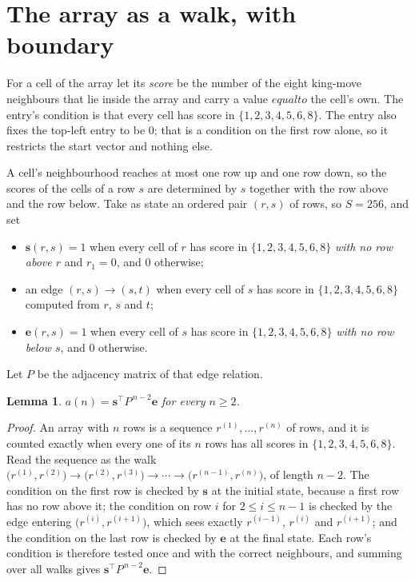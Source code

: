 \documentclass[11pt,a4paper]{article}
\theoremstyle{plain}
\newtheorem{lemma}[theorem]{Lemma}
\theoremstyle{definition}
\begin{document}
\section{The array as a walk, with boundary}

For a cell of the array let its \emph{score} be the number of the eight king-move neighbours that lie inside
the array and carry a value $equal to$ the cell's own. The entry's condition is that every cell
has score in $\{1,2,3,4,5,6,8\}$. The entry also fixes the top-left entry to be $0$; that is a condition on the first row alone, so it restricts the start vector and nothing else.

A cell's neighbourhood reaches at most one row up and one row down, so the scores of the
cells of a row $s$ are determined by $s$ together with the row above and the row below.
Take as state an ordered pair $(r,s)$ of rows, so $S=256$, and set
\begin{itemize}
\item $\mathbf{s}(r,s)=1$ when every cell of $r$ has score in $\{1,2,3,4,5,6,8\}$ \emph{with no row
above $r$} and $r_1=0$, and $0$ otherwise;
\item an edge $(r,s)\to(s,t)$ when every cell of $s$ has score in $\{1,2,3,4,5,6,8\}$ computed from
$r$, $s$ and $t$;
\item $\mathbf{e}(r,s)=1$ when every cell of $s$ has score in $\{1,2,3,4,5,6,8\}$ \emph{with no row
below $s$}, and $0$ otherwise.
\end{itemize}
Let $P$ be the adjacency matrix of that edge relation.

\begin{lemma}\label{lem:walk}
$a(n)=\mathbf{s}^{\!\top}P^{\,n-2}\mathbf{e}$ for every $n\ge2$.
\end{lemma}

\begin{proof}
An array with $n$ rows is a sequence $r^{(1)},\dots,r^{(n)}$ of rows, and it is counted
exactly when every one of its $n$ rows has all scores in $\{1,2,3,4,5,6,8\}$. Read the sequence as the
walk $\bigl(r^{(1)},r^{(2)}\bigr)\to\bigl(r^{(2)},r^{(3)}\bigr)\to\cdots\to
\bigl(r^{(n-1)},r^{(n)}\bigr)$, of length $n-2$. The condition on the first row is
checked by $\mathbf{s}$ at the initial state, because a first row has no row above it; the
condition on row $i$ for $2\le i\le n-1$ is checked by the edge entering
$\bigl(r^{(i)},r^{(i+1)}\bigr)$, which sees exactly $r^{(i-1)}$, $r^{(i)}$ and
$r^{(i+1)}$; and the condition on the last row is checked by $\mathbf{e}$ at the final
state. Each row's condition is therefore tested once and with the correct neighbours, and
summing over all walks gives $\mathbf{s}^{\!\top}P^{\,n-2}\mathbf{e}$.
\end{proof}
\end{document}
